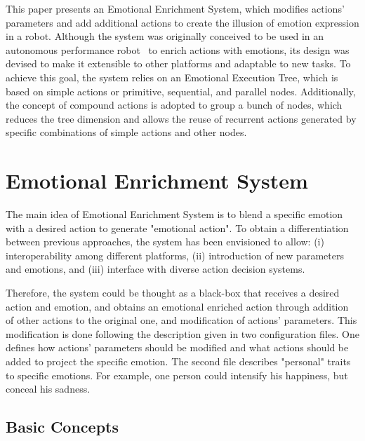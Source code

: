 \documentclass{sig-alternate-05-2015}
\begin{document}
This paper presents an Emotional Enrichment System, which modifies actions' parameters and add additional actions to create the illusion of emotion expression in a robot. Although the system was originally conceived to be used in an autonomous performance robot~\cite{angel2013} to enrich actions with emotions, its design was devised to make it extensible to other platforms and adaptable to new tasks. To achieve this goal, the system relies on an Emotional Execution Tree, which is based on simple actions or primitive, sequential, and parallel nodes. Additionally, the concept of compound actions is adopted to group a bunch of nodes, which reduces the tree dimension and allows the reuse of recurrent actions generated by specific combinations of simple actions and other nodes.

\section{Emotional Enrichment System}

The main idea of Emotional Enrichment System is to blend a specific emotion with a desired action to generate "emotional action". To obtain a differentiation between previous approaches, the system has been envisioned to allow: (i) interoperability among different platforms, (ii) introduction of new parameters and emotions, and (iii) interface with diverse action decision systems.

Therefore, the system could be thought as a black-box that receives a desired action and emotion, and obtains an emotional enriched action through addition of other actions to the original one, and modification of actions' parameters. This modification is done following the description given in two configuration files. One defines how actions' parameters should be modified and what actions should be added to project the specific emotion. The second file describes "personal" traits to specific emotions. For example, one person could intensify his happiness, but conceal his sadness. 

\subsection{Basic Concepts}
\end{document}
